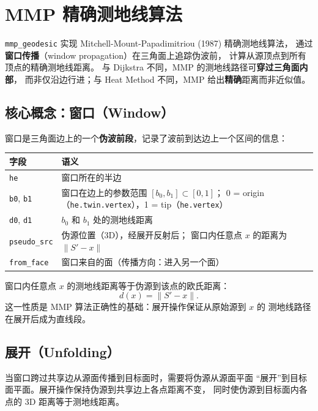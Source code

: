 \documentclass[11pt,a4paper]{article}
\begin{document}
\section{MMP 精确测地线算法}

\texttt{mmp\_geodesic} 实现 Mitchell-Mount-Papadimitriou (1987) 精确测地线算法，
通过\textbf{窗口传播}（window propagation）在三角面上追踪伪波前，
计算从源顶点到所有顶点的精确测地线距离。
与 Dijkstra 不同，MMP 的测地线路径可\textbf{穿过三角面内部}，
而非仅沿边行进；与 Heat Method 不同，MMP 给出\textbf{精确}距离而非近似值。

\subsection{核心概念：窗口（Window）}

窗口是三角面边上的一个\textbf{伪波前段}，记录了波前到达边上一个区间的信息：

\begin{center}
\renewcommand{\arraystretch}{1.18}
\begin{tabular}{@{}lp{9.0cm}@{}}
  \toprule
  \textbf{字段} & \textbf{语义} \\
  \midrule
  \texttt{he} & 窗口所在的半边 \\
  \texttt{b0}, \texttt{b1} & 窗口在边上的参数范围 $[b_0, b_1] \subset [0, 1]$；
    0 = origin（\texttt{he.twin.vertex}），1 = tip（\texttt{he.vertex}） \\
  \texttt{d0}, \texttt{d1} & $b_0$ 和 $b_1$ 处的测地线距离 \\
  \texttt{pseudo\_src} & 伪源位置（3D），经展开反射后；
    窗口内任意点 $x$ 的距离为 $\|S' - x\|$ \\
  \texttt{from\_face} & 窗口来自的面（传播方向：进入另一个面） \\
  \bottomrule
\end{tabular}
\end{center}

窗口内任意点 $x$ 的测地线距离等于伪源到该点的欧氏距离：
\[
  d(x) = \|S' - x\|.
\]
这一性质是 MMP 算法正确性的基础：展开操作保证从原始源到 $x$ 的
测地线路径在展开后成为直线段。

\subsection{展开（Unfolding）}

当窗口跨过共享边从源面传播到目标面时，需要将伪源从源面平面
``展开''到目标面平面。展开操作保持伪源到共享边上各点距离不变，
同时使伪源到目标面内各点的 3D 距离等于测地线距离。
\end{document}
